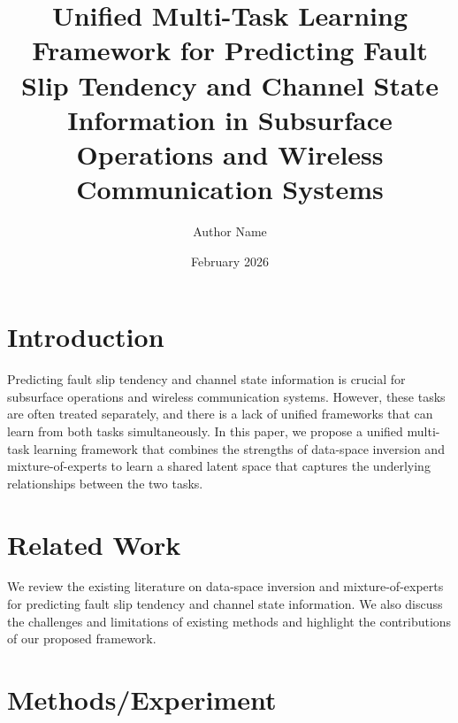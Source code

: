\documentclass{article}
\begin{document}
\title{Unified Multi-Task Learning Framework for Predicting Fault Slip Tendency and Channel State Information in Subsurface Operations and Wireless Communication Systems}

\author{Author Name}

\date{February 2026}

\maketitle


\section{Introduction}

Predicting fault slip tendency and channel state information is crucial for subsurface operations and wireless communication systems. However, these tasks are often treated separately, and there is a lack of unified frameworks that can learn from both tasks simultaneously. In this paper, we propose a unified multi-task learning framework that combines the strengths of data-space inversion and mixture-of-experts to learn a shared latent space that captures the underlying relationships between the two tasks.

\section{Related Work}

We review the existing literature on data-space inversion and mixture-of-experts for predicting fault slip tendency and channel state information. We also discuss the challenges and limitations of existing methods and highlight the contributions of our proposed framework.

\section{Methods/Experiment}
\end{document}
